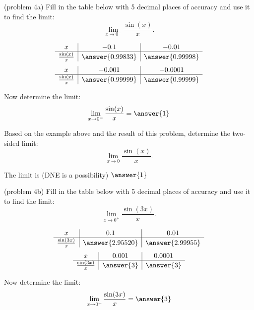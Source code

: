 \documentclass[handout]{ximera}
\begin{document}
\begin{problem}(problem 4a)
Fill in the table below with 5 decimal places of accuracy and use it to find the limit:
\[\lim_{x \to 0^-} \frac{\sin(x)}{x}.\]

\begin{center}
\[
\begin{array}{ c | c | c }
  x & -0.1 & -0.01   \\ 
	\hline 
	 \frac{\sin(x)}{x} & \answer{0.99833} & \answer{0.99998} 
\end{array}
\]
\[
\begin{array}{ c | c | c  }
  x  & -0.001 & -0.0001 \\ 
	\hline 
	 \frac{\sin(x)}{x}  & \answer{0.99999} & \answer{0.99999}
\end{array}
\]
\end{center}
Now determine the limit:
\[
\lim_{x \to 0^-} \frac{\sin(x)}{x} = \answer{1}
\]

Based on the example above and the result of this problem, determine the two-sided limit:
\[
\lim_{x \to 0} \frac{\sin(x)}{x}.
\]

The limit is (DNE is a possibility) $\answer{1}$
\end{problem}



\begin{problem}(problem 4b)
Fill in the table below with 5 decimal places of accuracy and use it to find the limit:
\[\lim_{x \to 0^+} \frac{\sin(3x)}{x}.\]

\begin{center}
\[
\begin{array}{ c | c | c }
  x & 0.1 & 0.01   \\ 
	\hline 
	 \frac{\sin(3x)}{x} & \answer{2.95520} & \answer{2.99955} 
\end{array}
\]
\[
\begin{array}{ c | c | c  }
  x  & 0.001 & 0.0001 \\ 
	\hline 
	 \frac{\sin(3x)}{x}  & \answer{3} & \answer{3}
\end{array}
\]
\end{center}
Now determine the limit:
\[
\lim_{x \to 0^+} \frac{\sin(3x)}{x} = \answer{3}
\]
\end{problem}
\end{document}
